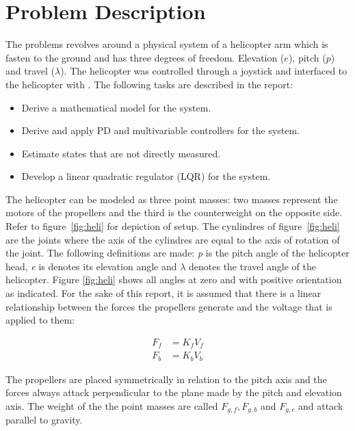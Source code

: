 \section{Problem Description}\label{sec:prob_descr}
The problems revolves around a physical system of a helicopter arm which is fasten to the ground and has three degrees of freedom. Elevation ($e$), pitch ($p$) and travel ($\lambda$). 
The helicopter was controlled through a joystick and interfaced to the helicopter with \MATLAB. The following tasks are described in the report:

\begin{itemize}
    \item Derive a mathematical model for the system.
    \item Derive and apply PD and multivariable controllers for the system.
    \item Estimate states that are not directly measured.
    \item Develop a linear quadratic regulator (LQR) for the system.
\end{itemize}

The helicopter can be modeled as three point masses: two masses represent the motors of the propellers and the third is the counterweight on the opposite side. Refer to figure~\ref{fig:heli} for depiction of setup. The cynlindres of figure~\ref{fig:heli} are the joints where the axis of the cylindres are equal to the axis of rotation of the joint. The following definitions are made: \textit{p} is the pitch angle of the helicopter head, \textit{e} is denotes its elevation angle and \textit{$\lambda$} denotes the travel angle of the helicopter. Figure \ref{fig:heli} shows all angles at zero and with positive orientation as indicated. For the sake of this report, it is assumed that there is a linear relationship between the forces the propellers generate and the voltage that is applied to them:

\begin{subequations}\label{eq:P1_forces_propellers}
    \begin{align}
        F_f&=K_f V_f     \label{eq:P1_forces_propellers_f} \\
        F_b&=K_b V_b     \label{eq:P1_forces_propellers_b}
    \end{align}
\end{subequations}

The propellers are placed symmetrically in relation to the pitch axis and the forces always attack perpendicular to the plane made by the pitch and elevation axis. The weight of the the point masses are called $F_{g,f}, F_{g,b}$ and $F_{g,c}$ and attack parallel to gravity.


